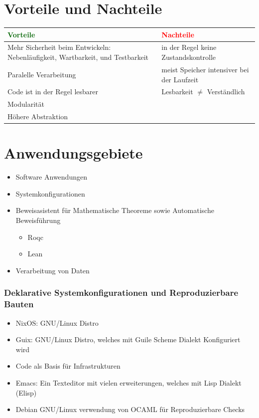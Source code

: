\documentclass{beamer}
\begin{document}
\section{Vorteile und Nachteile}
\begin{frame}
\centering
	\begin{tabular}{ |p{5cm}|p{5cm}|  }
		\hline
             \textcolor{darkgreen}{Vorteile} & \textcolor{red}{Nachteile} \\
		\hline
		Mehr Sicherheit beim Entwickeln: Nebenläufigkeit, Wartbarkeit, und Testbarkeit & in  der Regel keine Zustandskontrolle \\
            \hline 
            Paralelle Verarbeitung&  meist Speicher intensiver bei der Laufzeit  \\ 
		\hline
    Code ist in der Regel lesbarer  & Lesbarkeit $\neq$ Verständlich \\
    \hline
    Modularität & \\ 
      \hline 
            Höhere Abstraktion & \\
		\hline

 \end{tabular}
\end{frame}

\section{Anwendungsgebiete}
\begin{frame}
	\begin{itemize}
            \item Software Anwendungen 
            \item Systemkonfigurationen 
		\item Beweisasistent für Mathematische Theoreme sowie Automatische Beweisführung
		\begin{itemize}
			\item  Roqc 
			\item  Lean 
		\end{itemize}
            \item Verarbeitung von Daten
    \end{itemize}
\end{frame}

\begin{frame}
\frametitle{Deklarative Systemkonfigurationen und Reproduzierbare Bauten}
 \begin{itemize}
		\item NixOS: GNU/Linux Distro
		\item Guix: GNU/Linux Distro, welches mit Guile Scheme Dialekt Konfiguriert wird
		\item Code als Basis für Infrastrukturen
		\item Emacs: Ein Texteditor mit vielen erweiterungen, welches mit Lisp Dialekt (Elisp)
		\item Debian GNU/Linux verwendung von OCAML für Reproduzierbare Checks
\end{itemize}

\end{frame}
\end{document}
